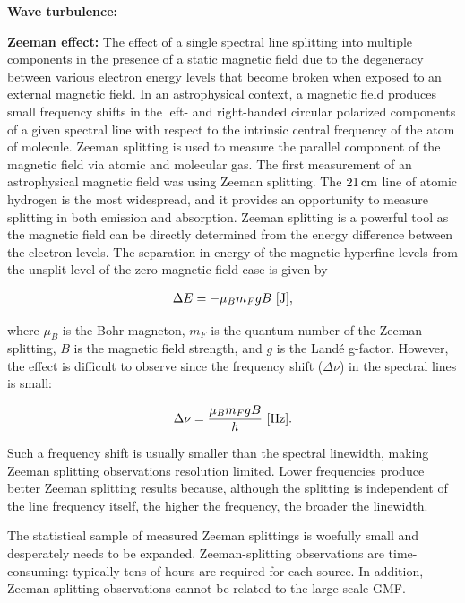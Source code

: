 \documentclass[a4paper,10pt]{article}
\begin{document}
{\noindent}\textbf{Wave turbulence:}

{\noindent}\textbf{Zeeman effect:} The effect of a single spectral line splitting into multiple components in the presence of a static magnetic field due to the degeneracy between various electron energy levels that become broken when exposed to an external magnetic field. In an astrophysical context, a magnetic field produces small frequency shifts in the left- and right-handed circular polarized components of a given spectral line with respect to the intrinsic central frequency of the atom of molecule. Zeeman splitting is used to measure the parallel component of the magnetic field via atomic and molecular gas. The first measurement of an astrophysical magnetic field was using Zeeman splitting. The $21\,{\rm cm}$ line of atomic hydrogen is the most widespread, and it provides an opportunity to measure splitting in both emission and absorption. Zeeman splitting is a powerful tool as the magnetic field can be directly determined from the energy difference between the electron levels. The separation in energy of the magnetic hyperfine levels from the unsplit level of the zero magnetic field case is given by

\begin{align*}
    \Delta E = -\mu_Bm_FgB ~ [{\rm J}],
\end{align*}

{\noindent}where $\mu_B$ is the Bohr magneton, $m_F$ is the quantum number of the Zeeman splitting, $B$ is the magnetic field strength, and $g$ is the Land\'e g-factor. However, the effect is difficult to observe since the frequency shift ($\Delta\nu$) in the spectral lines is small:

\begin{align*}
    \Delta\nu = \frac{\mu_Bm_FgB}{h} ~ [{\rm Hz}].
\end{align*}

{\noindent}Such a frequency shift is usually smaller than the spectral linewidth, making Zeeman splitting observations resolution limited. Lower frequencies produce better Zeeman splitting results because, although the splitting is independent of the line frequency itself, the higher the frequency, the broader the linewidth.

{\noindent}The statistical sample of measured Zeeman splittings is woefully small and desperately needs to be expanded. Zeeman-splitting observations are time-consuming: typically tens of hours are required for each source. In addition, Zeeman splitting observations cannot be related to the large-scale GMF.
\end{document}
